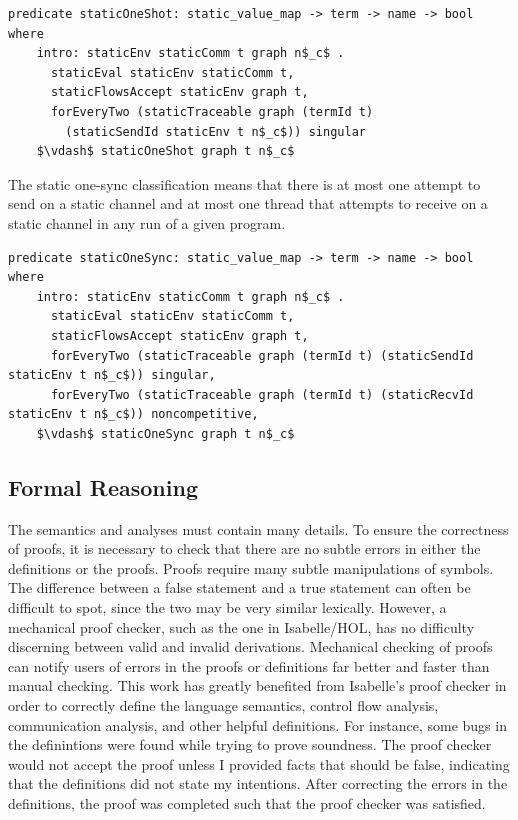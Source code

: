 \documentclass[letterpaper, 11pt]{report}
\begin{document}
\begin{lstlisting}[language=logic, mathescape]
  predicate staticOneShot: static_value_map -> term -> name -> bool where
    intro: staticEnv staticComm t graph n$_c$ .
      staticEval staticEnv staticComm t,
      staticFlowsAccept staticEnv graph t,
      forEveryTwo (staticTraceable graph (termId t)
        (staticSendId staticEnv t n$_c$)) singular
    $\vdash$ staticOneShot graph t n$_c$
\end{lstlisting}

The static one-sync classification means that there is at most one attempt to send on a
static channel and at most one
thread that attempts to receive on a static channel in any run of a given program.

\begin{lstlisting}[language=logic, mathescape]
  predicate staticOneSync: static_value_map -> term -> name -> bool where
    intro: staticEnv staticComm t graph n$_c$ .
      staticEval staticEnv staticComm t,
      staticFlowsAccept staticEnv graph t,
      forEveryTwo (staticTraceable graph (termId t) (staticSendId staticEnv t n$_c$)) singular,
      forEveryTwo (staticTraceable graph (termId t) (staticRecvId staticEnv t n$_c$)) noncompetitive,
    $\vdash$ staticOneSync graph t n$_c$
\end{lstlisting}



\subsection{Formal Reasoning}
The semantics and analyses must contain many details. To ensure the
correctness of proofs, it is necessary to check that there are no subtle errors in either the 
definitions or the proofs. Proofs require many subtle manipulations of symbols. The
difference between a false statement and a true statement can often be difficult to spot, since
the two may be very similar lexically. However, a mechanical proof checker, such as the one in
Isabelle/HOL, has no difficulty discerning between valid and invalid derivations.
Mechanical checking of proofs can notify users of errors in the proofs or definitions far better
and faster than manual checking. This work has greatly benefited from Isabelle's proof checker in
order to correctly define the language semantics, control flow analysis, communication analysis,
and other helpful definitions. For instance, some bugs in the
definintions were found while trying to prove soundness.
The proof checker would not accept the proof unless I provided facts that
should be false, indicating that the definitions did not state my intentions.
After correcting the errors in the definitions, the proof was completed such that the proof
checker was satisfied.
\end{document}
